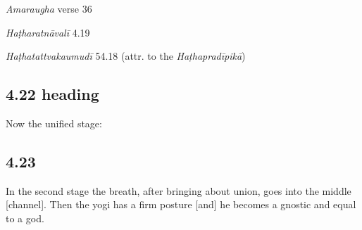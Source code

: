 \begin{ekdosis}
\begin{sources}[hp04_021]
\emph{Amaraugha} verse 36
\begin{versinnote}
\tl{\var{°hṛdaye ] \emph{Amaraugha}, °hṛdayaḥ \emph{Amaraughaprabodha}}\\!}
\end{versinnote}
\end{sources}

\begin{testimonia}[hp04_021]
\emph{Haṭharatnāvalī} 4.19
\begin{versinnote}
\end{versinnote}

\emph{Haṭhatattvakaumudī} 54.18 (attr. to the \emph{Haṭhapradīpikā})
\begin{versinnote}
\end{versinnote}
\end{testimonia}


\subsection*{4.22 heading}
\begin{translation}[hp04_022a]
Now the unified stage:
\end{translation}


\subsection*{4.23}
\begin{translation}[hp04_022]
In the second stage the breath, after bringing about union, goes into the middle [channel]. Then the yogi has a firm posture [and] he becomes a gnostic and equal to a god.
\end{translation}



\end{ekdosis}
